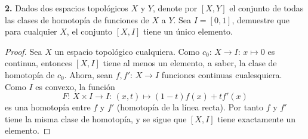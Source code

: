 \textbf{2.} Dados dos espacios topológicos $X$ y $Y$, denote por $[X,Y]$ el conjunto de todas las clases de homotopía de funciones de $X$ a $Y$. Sea $I=[0,1]$, demuestre que para cualquier $X$, el conjunto $[X,I]$ tiene un único elemento. 
\begin{proof}
   Sea $X$ un espacio topológico cualquiera. Como $c_0:\, X\to I: \, x\mapsto 0$ es continua, entonces $[X,I]$ tiene al menos un elemento, a saber, la clase de homotopía de $c_0$. Ahora, sean $f,f': \, X\to I$ funciones continuas cualesquiera. Como $I$ es convexo, la función 
   $$
   F:\, X\times I\to I:\, (x,t)\mapsto (1-t)f(x)+tf'(x)
   $$ 
   es una homotopía entre $f$ y $f'$ (homotopía de la línea recta). Por tanto $f$ y $f'$ tiene la misma clase de homotopía, y se sigue que $[X,I]$ tiene exactamente un elemento. 
\end{proof}
\clearpage
